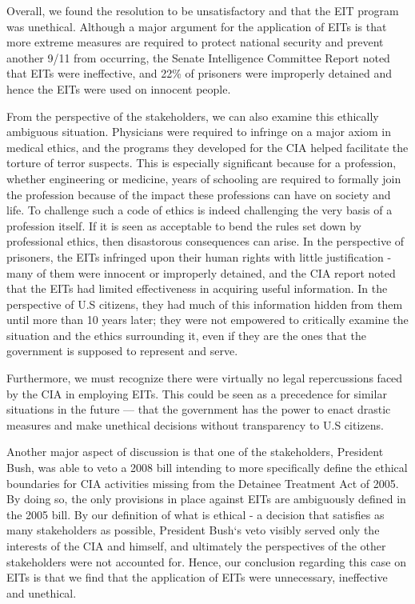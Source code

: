 \documentclass{article}
\begin{document}
Overall, we found the resolution to be unsatisfactory and that the EIT program was unethical. Although a major argument for the application of EITs is that more extreme measures are required to protect national security and prevent another 9/11 from occurring, the Senate Intelligence Committee Report noted that EITs were ineffective, and 22\% of prisoners were improperly detained and hence the EITs were used on innocent people. \par
\vspace{5pt}
From the perspective of the stakeholders, we can also examine this ethically ambiguous situation. Physicians were required to infringe on a major axiom in medical ethics, and the programs they developed for the CIA helped facilitate the torture of terror suspects. This is especially significant because for a profession, whether engineering or medicine, years of schooling are required to formally join the profession because of the impact these professions can have on society and life. To challenge such a code of ethics is indeed challenging the very basis of a profession itself. If it is seen as acceptable to bend the rules set down by professional ethics, then disastorous consequences can arise. In the perspective of prisoners, the EITs infringed upon their human rights with little justification - many of them were innocent or improperly detained, and the CIA report noted that the EITs had limited effectiveness in acquiring useful information. In the perspective of U.S citizens, they had much of this information hidden from them until more than 10 years later; they were not empowered to critically examine the situation and the ethics surrounding it, even if they are the ones that the government is supposed to represent and serve. \par

Furthermore, we must recognize there were virtually no legal repercussions faced by the CIA in employing EITs. This could be seen as a precedence for similar situations in the future --- that the government has the power to enact drastic measures and make unethical decisions without transparency to U.S citizens. \par
\vspace{5pt}

Another major aspect of discussion is that one of the stakeholders, President Bush, was able to veto a 2008 bill intending to more specifically define the ethical boundaries for CIA activities missing from the Detainee Treatment Act of 2005. By doing so, the only provisions in place against EITs are ambiguously defined in the 2005 bill. By our definition of what is ethical - a decision that satisfies as many stakeholders as possible, President Bush\lq s veto visibly served only the interests of the CIA and himself, and ultimately the perspectives of the other stakeholders were not accounted for. Hence, our conclusion regarding this case on EITs is that we find that the application of EITs were unnecessary, ineffective and unethical. \par
\end{document}

